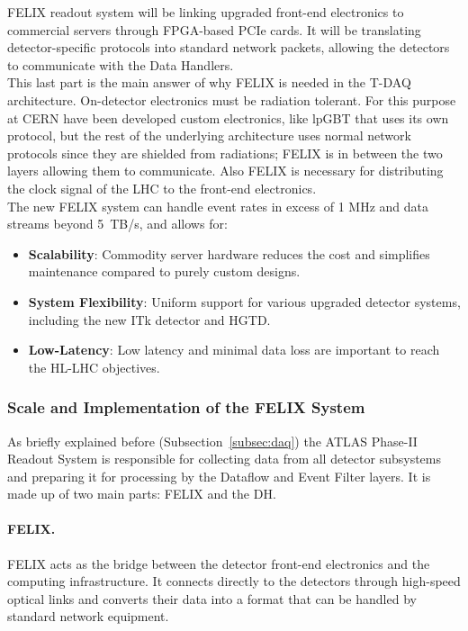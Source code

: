 \acs{FELIX} readout system will be linking upgraded front-end electronics to commercial servers through \acs{FPGA}-based \acs{PCIe} cards. It will be translating detector-specific protocols into standard network packets, allowing the detectors to communicate with the Data Handlers.\\
This last part is the main answer of why \acs{FELIX} is needed in the \acs{T-DAQ} architecture. On-detector electronics must be radiation tolerant. For this purpose at \acs{CERN} have been developed custom electronics, like \acl{lpGBT} \cite{lpgbt} that uses its own protocol, but the rest of the underlying architecture uses normal network protocols since they are shielded from radiations; \acs{FELIX} is in between the two layers allowing them to communicate. Also \acs{FELIX} is necessary for distributing the clock signal of the \acs{LHC} to the front-end electronics.\\
The new \acs{FELIX} system can handle event rates in excess of 1 MHz and data streams beyond 5~TB/s, and allows for:
\begin{itemize}
    \item \textbf{Scalability}: Commodity server hardware reduces the cost and simplifies maintenance compared to purely custom designs.
    \item \textbf{System Flexibility}: Uniform support for various upgraded detector systems, including the new \acs{ITk} detector and \acs{HGTD}.
    \item \textbf{Low-Latency}: Low latency and minimal data loss are important to reach the \acs{HL-LHC} objectives.
\end{itemize}

\subsubsection{Scale and Implementation of the \acs{FELIX} System}

As briefly explained before (Subsection~\ref{subsec:daq}) the \acs{ATLAS} Phase-II Readout System is responsible for collecting data from all detector subsystems and preparing it for processing by the Dataflow and Event Filter layers. It is made up of two main parts: \acs{FELIX} and the \acf{DH}.

\paragraph{FELIX.}
\acf{FELIX} acts as the bridge between the detector front-end electronics and the computing infrastructure. It connects directly to the detectors through high-speed optical links and converts their data into a format that can be handled by standard network equipment.

